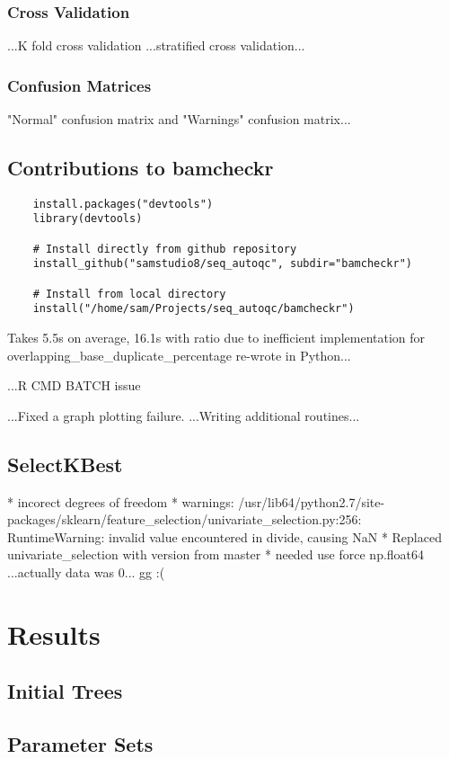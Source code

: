 \subsubsection{Cross Validation}
...K fold cross validation
...stratified cross validation...

\subsubsection{Confusion Matrices}
"Normal" confusion matrix and "Warnings" confusion matrix...

\subsection{Contributions to bamcheckr}
\begin{verbatim}
    install.packages("devtools")
    library(devtools)

    # Install directly from github repository
    install_github("samstudio8/seq_autoqc", subdir="bamcheckr")

    # Install from local directory
    install("/home/sam/Projects/seq_autoqc/bamcheckr")

\end{verbatim}
Takes 5.5s on average, 16.1s with ratio due to inefficient implementation
for overlapping\_base\_duplicate\_percentage
re-wrote in Python...


...R CMD BATCH issue

...Fixed a graph plotting failure.
...Writing additional routines...

\subsection{SelectKBest}
* incorect degrees of freedom
* warnings: /usr/lib64/python2.7/site-packages/sklearn/feature\_selection/univariate\_selection.py:256: RuntimeWarning: invalid value encountered in divide, causing NaN
* Replaced univariate\_selection with version from master
* needed use force np.float64
...actually data was 0... gg :(

\section{Results}
\subsection{Initial Trees}
\subsection{Parameter Sets}
